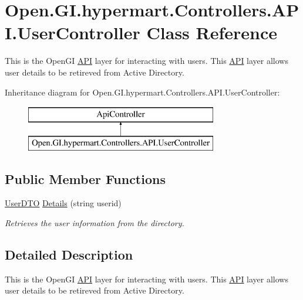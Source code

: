\hypertarget{class_open_1_1_g_i_1_1hypermart_1_1_controllers_1_1_a_p_i_1_1_user_controller}{}\section{Open.\+G\+I.\+hypermart.\+Controllers.\+A\+P\+I.\+User\+Controller Class Reference}
\label{class_open_1_1_g_i_1_1hypermart_1_1_controllers_1_1_a_p_i_1_1_user_controller}


This is the Open\+G\+I \hyperlink{namespace_open_1_1_g_i_1_1hypermart_1_1_controllers_1_1_a_p_i}{A\+P\+I} layer for interacting with users. This \hyperlink{namespace_open_1_1_g_i_1_1hypermart_1_1_controllers_1_1_a_p_i}{A\+P\+I} layer allows user details to be retireved from Active Directory.  


Inheritance diagram for Open.\+G\+I.\+hypermart.\+Controllers.\+A\+P\+I.\+User\+Controller\+:\begin{figure}[H]
\begin{center}
\leavevmode
\includegraphics[height=2.000000cm]{class_open_1_1_g_i_1_1hypermart_1_1_controllers_1_1_a_p_i_1_1_user_controller}
\end{center}
\end{figure}
\subsection*{Public Member Functions}
\begin{DoxyCompactItemize}
\item 
\hyperlink{class_open_1_1_g_i_1_1hypermart_1_1_data_transformation_objects_1_1_user_d_t_o}{User\+D\+T\+O} \hyperlink{class_open_1_1_g_i_1_1hypermart_1_1_controllers_1_1_a_p_i_1_1_user_controller_af2896a942d750bcc948228c298221f15}{Details} (string userid)
\begin{DoxyCompactList}\small\item\em Retrieves the user information from the directory. \end{DoxyCompactList}\end{DoxyCompactItemize}


\subsection{Detailed Description}
This is the Open\+G\+I \hyperlink{namespace_open_1_1_g_i_1_1hypermart_1_1_controllers_1_1_a_p_i}{A\+P\+I} layer for interacting with users. This \hyperlink{namespace_open_1_1_g_i_1_1hypermart_1_1_controllers_1_1_a_p_i}{A\+P\+I} layer allows user details to be retireved from Active Directory. 

